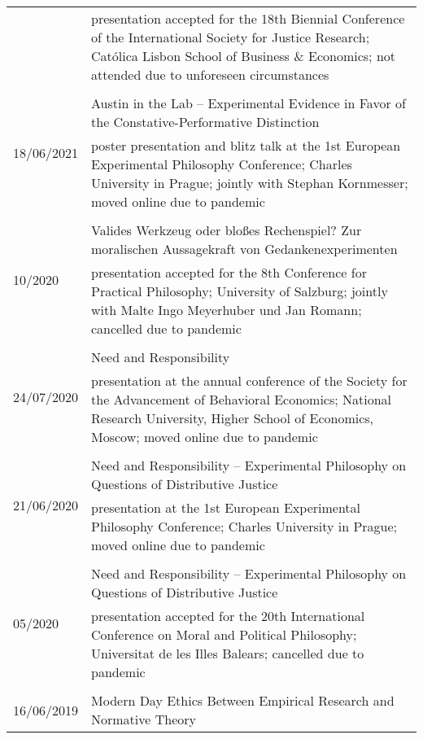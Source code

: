 \documentclass[a4paper,10pt]{article}
\begin{document}
\begin{longtable}{p{2.25cm}p{11cm}}
& \footnotesize{presentation accepted for the 18th Biennial Conference of the International Society for Justice Research; Católica Lisbon School of Business \& Economics; not attended due to unforeseen circumstances}\\
\\
\multirow{2}{2.25cm}{\footnotesize{18/06/2021}} & Austin in the Lab -- Experimental Evidence in Favor of the Constative-Performative Distinction\\
& \footnotesize{poster presentation and blitz talk at the 1st European Experimental Philosophy Conference; Charles University in Prague; jointly with Stephan Kornmesser; moved online due to pandemic}\\
\\
\multirow{2}{2.25cm}{\footnotesize{10/2020}} & Valides Werkzeug oder bloßes Rechenspiel? Zur moralischen Aussagekraft von Gedankenexperimenten\\
& \footnotesize{presentation accepted for the 8th Conference for Practical Philosophy; University of Salzburg; jointly with Malte Ingo Meyerhuber und Jan Romann; cancelled due to pandemic}\\
\\
\multirow{2}{2.25cm}{\footnotesize{24/07/2020}} & Need and Responsibility\\
& \footnotesize{presentation at the annual conference of the Society for the Advancement of Behavioral Economics; National Research University, Higher School of Economics, Moscow; moved online due to pandemic}\\
\\
\multirow{2}{2.25cm}{\footnotesize{21/06/2020}} & Need and Responsibility -- Experimental Philosophy on Questions of Distributive Justice\\
& \footnotesize{presentation at the 1st European Experimental Philosophy Conference; Charles University in Prague; moved online due to pandemic}\\
\\
\multirow{2}{2.25cm}{\footnotesize{05/2020}} & Need and Responsibility -- Experimental Philosophy on Questions of Distributive Justice\\
& \footnotesize{presentation accepted for the 20th International Conference on Moral and Political Philosophy; Universitat de les Illes Balears; cancelled due to pandemic}\\
\\
\multirow{2}{2.25cm}{\footnotesize{16/06/2019}} & Modern Day Ethics Between Empirical Research and Normative Theory\\

\end{longtable}
\end{document}

